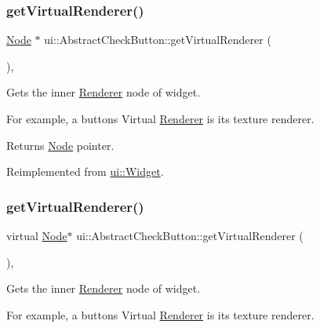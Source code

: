 \subsubsection{\texorpdfstring{get\+Virtual\+Renderer()}{getVirtualRenderer()}\hspace{0.1cm}{\footnotesize\ttfamily [1/2]}}
{\footnotesize\ttfamily \hyperlink{classNode}{Node} $\ast$ ui\+::\+Abstract\+Check\+Button\+::get\+Virtual\+Renderer (\begin{DoxyParamCaption}{ }\end{DoxyParamCaption})\hspace{0.3cm}{\ttfamily [override]}, {\ttfamily [virtual]}}

Gets the inner \hyperlink{classRenderer}{Renderer} node of widget.

For example, a button\textquotesingle{}s Virtual \hyperlink{classRenderer}{Renderer} is it\textquotesingle{}s texture renderer.

\begin{DoxyReturn}{Returns}
\hyperlink{classNode}{Node} pointer. 
\end{DoxyReturn}


Reimplemented from \hyperlink{classui_1_1Widget_acf862bf9235fbb3823819eeb65d46f25}{ui\+::\+Widget}.

\mbox{\label{classui_1_1AbstractCheckButton_a4affc93c2631571aebcc499ddc2f0f62}} 
\subsubsection{\texorpdfstring{get\+Virtual\+Renderer()}{getVirtualRenderer()}\hspace{0.1cm}{\footnotesize\ttfamily [2/2]}}
{\footnotesize\ttfamily virtual \hyperlink{classNode}{Node}$\ast$ ui\+::\+Abstract\+Check\+Button\+::get\+Virtual\+Renderer (\begin{DoxyParamCaption}{ }\end{DoxyParamCaption})\hspace{0.3cm}{\ttfamily [override]}, {\ttfamily [virtual]}}

Gets the inner \hyperlink{classRenderer}{Renderer} node of widget.

For example, a button\textquotesingle{}s Virtual \hyperlink{classRenderer}{Renderer} is it\textquotesingle{}s texture renderer.

